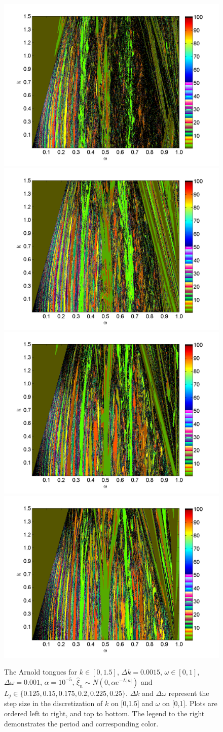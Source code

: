 \begin{figure}[H]\linespread{1}  
\caption[The Arnold tongues for the random circle map, normal
distribution, $\alpha = 10^{-5}$, $L \in (0.1,0.3)$]{The Arnold
  tongues for $k\in [0,1.5]$, $\Delta k = 0.0015$, $\omega \in [0,1]$,
  $\Delta \omega = 0.001$, $\alpha = 10^{-5}$, $\hat{\xi}_n\sim
  N(0,\alpha e^{-L|n|})$ and $L_j \in
  \{0.125,0.15,0.175,0.2,0.225,0.25\}$. $\Delta k$ and $\Delta \omega$
  represent the step size in the discretization of $k$ on [0,1.5] and $\omega$
  on [0,1]. Plots are ordered left to right, and top to bottom. The legend
to the right demonstrates the period and corresponding color.}\label{fig:rcirctongues_n2}
\centering
\includegraphics[width=.5\textwidth]{figs/tongues_n_ma_1000_L_0125.png}\hfill
\includegraphics[width=.5\textwidth]{figs/tongues_n_ma_1000_L_015.png}\\
\includegraphics[width=.5\textwidth]{figs/tongues_n_ma_1000_L_0175.png}\hfill
\includegraphics[width=.5\textwidth]{figs/tongues_n_ma_1000_L_02.png}\\

\end{figure}
